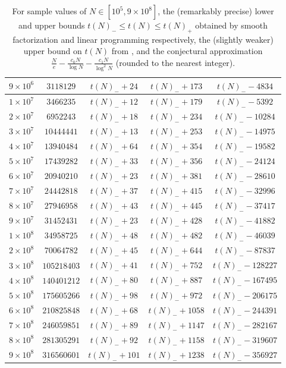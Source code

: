 \documentclass[10pt,a4paper,reqno]{amsart}
\numberwithin{equation}{section}
\theoremstyle{plain}
\theoremstyle{definition}
\begin{document}
\begin{table}[ht]
\begin{tabular}{|c|c|c|c|c|}
$9 \times 10^6$ & $\num{3118129}$ & $t(N)_- + 24$ & $t(N)_- + 173$ & $t(N)_- - \num{4834}$ \\
\hline
\rule{0pt}{12pt}$1 \times 10^7$ & $\num{3466235}$ & $t(N)_- + 12$ & $t(N)_- + 179$ & $t(N)_- - \num{5392}$ \\
$2 \times 10^7$ & $\num{6952243}$ & $t(N)_- + 18$ & $t(N)_- + 234$ & $t(N)_- - \num{10284}$ \\
$3 \times 10^7$ & $\num{10444441}$ & $t(N)_- + 13$ & $t(N)_- + 253$ & $t(N)_- - \num{14975}$ \\
$4 \times 10^7$ & $\num{13940484}$ & $t(N)_- + 64$ & $t(N)_- + 354$ & $t(N)_- - \num{19582}$ \\
$5 \times 10^7$ & $\num{17439282}$ & $t(N)_- + 33$ & $t(N)_- + 356$ & $t(N)_- - \num{24124}$ \\
$6 \times 10^7$ & $\num{20940210}$ & $t(N)_- + 23$ & $t(N)_- + 381$ & $t(N)_- - \num{28610}$ \\
$7 \times 10^7$ & $\num{24442818}$ & $t(N)_- + 37$ & $t(N)_- + 415$ & $t(N)_- - \num{32996}$ \\
$8 \times 10^7$ & $\num{27946958}$ & $t(N)_- + 43$ & $t(N)_- + 445$ & $t(N)_- - \num{37417}$ \\
$9 \times 10^7$ & $\num{31452431}$ & $t(N)_- + 23$ & $t(N)_- + 428$ & $t(N)_- - \num{41882}$ \\
\hline
\rule{0pt}{12pt}$1 \times 10^8$ & $\num{34958725}$ & $t(N)_- + 48$ & $t(N)_- + 482$ & $t(N)_- - \num{46039}$ \\
$2 \times 10^8$ & $\num{70064782}$ & $t(N)_- + 45$ & $t(N)_- + 644$ & $t(N)_- - \num{87837}$ \\
$3 \times 10^8$ & $\num{105218403}$ & $t(N)_- + 41$ & $t(N)_- + 752$ & $t(N)_- - \num{128227}$ \\
$4 \times 10^8$ & $\num{140401212}$ & $t(N)_- + 80$ & $t(N)_- + 887$ & $t(N)_- - \num{167495}$ \\
$5 \times 10^8$ & $\num{175605266}$ & $t(N)_- + 98$ & $t(N)_- + 972$ & $t(N)_- - \num{206175}$ \\
$6 \times 10^8$ & $\num{210825848}$ & $t(N)_- + 68$ & $t(N)_- + 1058$ & $t(N)_- - \num{244391}$ \\
$7 \times 10^8$ & $\num{246059851}$ & $t(N)_- + 89$ & $t(N)_- + 1147$ & $t(N)_- - \num{282167}$ \\
$8 \times 10^8$ & $\num{281305291}$ & $t(N)_- + 92$ & $t(N)_- + 1158$ & $t(N)_- - \num{319607}$ \\
$9 \times 10^8$ & $\num{316560601}$ & $t(N)_- + 101$ & $t(N)_- + 1238$ & $t(N)_- - \num{356927}$ \\
\hline
\end{tabular}
\bigskip

\caption{For sample values of $N \in [10^5, 9 \times 10^8]$, the (remarkably precise) lower and upper bounds $t(N)_- \leq t(N) \leq t(N)_+$ obtained by smooth factorization and linear programming respectively, the (slightly weaker) upper bound on $t(N)$ from , and the conjectural approximation $\frac{N}{e} - \frac{c_0 N}{\log N} - \frac{c_1N}{\log^2 N}$ (rounded to the nearest integer). }\label{long-table}
\end{table}
\end{document}
